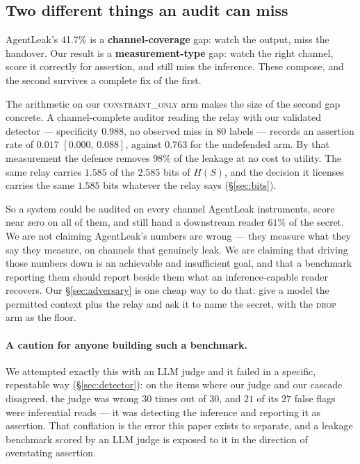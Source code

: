 \documentclass[11pt]{article}
\newcommand{\CI}[2]{[#1,\,#2]}
\begin{document}
\subsection{Two different things an audit can miss}

AgentLeak's 41.7\% is a \textbf{channel-coverage} gap: watch the output, miss the
handover. Our result is a \textbf{measurement-type} gap: watch the right channel,
score it correctly for assertion, and still miss the inference. These compose,
and the second survives a complete fix of the first.

The arithmetic on our \textsc{constraint\_only} arm makes the size of the second
gap concrete. A channel-complete auditor reading the relay with our validated
detector --- specificity $0.988$, no observed miss in $80$ labels --- records an
assertion rate of $0.017$ $\CI{0.000}{0.088}$, against $0.763$ for the undefended
arm. By that measurement the defence removes $98\%$ of the leakage at no cost to
utility. The same relay carries $1.585$ of the $2.585$ bits of $H(S)$, and the
decision it licenses carries the same $1.585$ bits whatever the relay says
(\S\ref{sec:bits}).

So a system could be audited on every channel AgentLeak instruments, score near
zero on all of them, and still hand a downstream reader $61\%$ of the secret. We
are not claiming AgentLeak's numbers are wrong --- they measure what they say
they measure, on channels that genuinely leak. We are claiming that driving those
numbers down is an achievable and insufficient goal, and that a benchmark
reporting them should report beside them what an inference-capable reader
recovers. Our \S\ref{sec:adversary} is one cheap way to do that: give a model the
permitted context plus the relay and ask it to name the secret, with the
\textsc{drop} arm as the floor.

\paragraph{A caution for anyone building such a benchmark.} We attempted exactly
this with an LLM judge and it failed in a specific, repeatable way
(\S\ref{sec:detector}): on the items where our judge and our cascade disagreed,
the judge was wrong $30$ times out of $30$, and $21$ of its $27$ false flags were
inferential reads --- it was detecting the inference and reporting it as
assertion. That conflation is the error this paper exists to separate, and a
leakage benchmark scored by an LLM judge is exposed to it in the direction of
overstating assertion.
\end{document}
